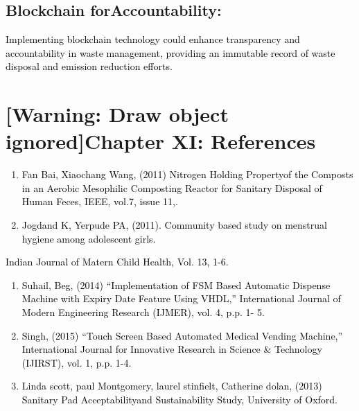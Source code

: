 \documentclass[letterpaper]{article}
\newcounter{saveenum}
\newcommand\liststyleWWNumix{%
\renewcommand\theenumi{\arabic{enumi}}
\renewcommand\labelenumi{\theenumi}
\renewcommand\labelitemi{{\textbullet}}
\renewcommand\labelitemii{{\textbullet}}
\renewcommand\labelitemiii{{\textbullet}}
}
\begin{document}
\subsection{Blockchain forAccountability:}
\textcolor{black}{Implementing blockchain technology could enhance transparency and accountability in waste management,
providing an immutable record of waste disposal and emission reduction efforts.}

\clearpage\setcounter{page}{1}\pagestyle{Convertedxxiii}
\section[Chapter XI: References]{[Warning: Draw object ignored]Chapter XI: References}

\bigskip


\bigskip

\liststyleWWNumix
\begin{enumerate}
\item \textcolor{black}{Fan Bai, Xiaochang Wang, (2011) Nitrogen Holding Propertyof the Composts in an Aerobic
Mesophilic Composting Reactor for Sanitary Disposal of Human Feces, IEEE, vol.7, issue 11,.}
\item \textcolor{black}{Jogdand K, Yerpude PA, (2011). Community based study on menstrual hygiene among adolescent
girls.}
\end{enumerate}

\bigskip

\textcolor{black}{Indian Journal of Matern Child Health, Vol. 13, 1-6.}

\liststyleWWNumix
\setcounter{saveenum}{\value{enumi}}
\begin{enumerate}
\setcounter{enumi}{\value{saveenum}}
\item \textcolor{black}{Suhail, Beg, (2014) ``Implementation of FSM Based Automatic Dispense Machine with Expiry Date
Feature Using VHDL,'' International Journal of Modern Engineering Research (IJMER), vol. 4, p.p. 1- 5.}
\item \textcolor{black}{Singh, (2015) ``Touch Screen Based Automated Medical Vending Machine,'' International Journal
for Innovative Research in Science \& Technology (IJIRST), vol. 1, p.p. 1-4.}
\item \textcolor{black}{Linda scott, paul Montgomery, laurel stinfielt, Catherine dolan, (2013) Sanitary Pad
Acceptabilityand Sustainability Study, University of Oxford.}
\end{enumerate}

\bigskip
\end{document}
